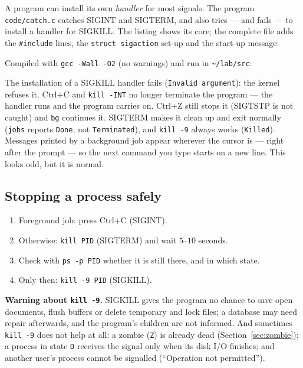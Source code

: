 \documentclass[11pt,a4paper]{article}
\newcommand{\cmd}[1]{\texttt{#1}}
\begin{document}
A program can install its own \emph{handler} for most signals. The program \texttt{code/catch.c} catches SIGINT and SIGTERM, and also tries --- and fails --- to install a handler for SIGKILL. The listing shows its core; the complete file adds the \texttt{\#include} lines, the \texttt{struct sigaction} set-up and the start-up message:



Compiled with \cmd{gcc -Wall -O2} (no warnings) and run in \texttt{\textasciitilde/lab/src}:



The installation of a SIGKILL handler fails (\texttt{Invalid argument}): the kernel refuses it. Ctrl+C and \cmd{kill -INT} no longer terminate the program --- the handler runs and the program carries on. Ctrl+Z still stops it (SIGTSTP is not caught) and \cmd{bg} continues it. SIGTERM makes it clean up and exit normally (\cmd{jobs} reports \texttt{Done}, not \texttt{Terminated}), and \cmd{kill -9} always works (\texttt{Killed}).
Messages printed by a background job appear wherever the cursor is --- right after the prompt --- so the next command you type starts on a new line. This looks odd, but it is normal.

\subsection{Stopping a process safely}

\begin{keyidea}
\begin{enumerate}[leftmargin=1.4em]
  \item Foreground job: press Ctrl+C (SIGINT).
  \item Otherwise: \cmd{kill PID} (SIGTERM) and wait $5$--$10$ seconds.
  \item Check with \cmd{ps -p PID} whether it is still there, and in which state.
  \item Only then: \cmd{kill -9 PID} (SIGKILL).
\end{enumerate}
\end{keyidea}

\textbf{Warning about \cmd{kill -9}.} SIGKILL gives the program no chance to save open documents, flush buffers or delete temporary and lock files; a database may need repair afterwards, and the program's children are not informed. And sometimes \cmd{kill -9} does not help at all: a zombie (\texttt{Z}) is already dead (Section~\ref{sec:zombie}); a process in state \texttt{D} receives the signal only when its disk I/O finishes; and another user's process cannot be signalled (``Operation not permitted'').
\end{document}

